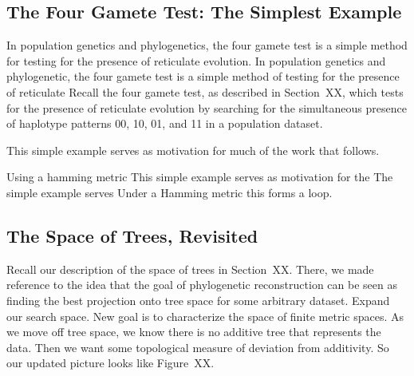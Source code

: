\subsection{The Four Gamete Test: The Simplest Example}

In population genetics and phylogenetics, the four gamete test is a simple method for testing for the presence of reticulate evolution.
In population genetics and phylogenetic, the four gamete test is a simple method of testing for the presence of reticulate 
Recall the four gamete test, as described in Section~XX, which tests for the presence of reticulate evolution by searching for the simultaneous presence of haplotype patterns 00, 10, 01, and 11 in a population dataset.

This simple example serves as motivation for much of the work that follows.

Using a hamming metric
This simple example serves as motivation for the 
The simple example serves
Under a Hamming metric this forms a loop.

\subsection{The Space of Trees, Revisited}

Recall our description of the space of trees in Section~XX.
There, we made reference to the idea that the goal of phylogenetic reconstruction can be seen as finding the best projection onto tree space for some arbitrary dataset.
Expand our search space.
New goal is to characterize the space of finite metric spaces.
As we move off tree space, we know there is no additive tree that represents the data.
Then we want some topological measure of deviation from additivity.
So our updated picture looks like Figure~XX.


